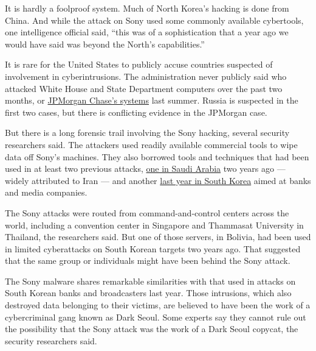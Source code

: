 It is hardly a foolproof system. Much of North Korea's hacking is done
from China. And while the attack on Sony used some commonly available
cybertools, one intelligence official said, ``this was of a
sophistication that a year ago we would have said was beyond the North's
capabilities.''

It is rare for the United States to publicly accuse countries suspected
of involvement in cyberintrusions. The administration never publicly
said who attacked White House and State Department computers over the
past two months, or
\href{http://dealbook.nytimes3xbfgragh.onion/2014/10/02/jpmorgan-discovers-further-cyber-security-issues/?module=Search\&mabReward=relbias\%3Ar\%2C\%7B\%221\%22\%3A\%22RI\%3A8\%22\%7D}{JPMorgan
Chase's systems} last summer. Russia is suspected in the first two
cases, but there is conflicting evidence in the JPMorgan case.

But there is a long forensic trail involving the Sony hacking, several
security researchers said. The attackers used readily available
commercial tools to wipe data off Sony's machines. They also borrowed
tools and techniques that had been used in at least two previous
attacks,
\href{http://www.nytimes3xbfgragh.onion/2012/10/14/world/middleeast/us-suspects-iranians-were-behind-a-wave-of-cyberattacks.html?pagewanted=all\&module=Search\&mabReward=relbias\%3Ar\%2C\%7B\%221\%22\%3A\%22RI\%3A8\%22\%7D}{one
in Saudi Arabia} two years ago --- widely attributed to Iran --- and
another
\href{http://www.nytimes3xbfgragh.onion/2013/03/21/world/asia/south-korea-computer-network-crashes.html?pagewanted=all\&module=Search\&mabReward=relbias\%3Ar\%2C\%7B\%221\%22\%3A\%22RI\%3A8\%22\%7D}{last
year in South Korea} aimed at banks and media companies.

The Sony attacks were routed from command-and-control centers across the
world, including a convention center in Singapore and Thammasat
University in Thailand, the researchers said. But one of those servers,
in Bolivia, had been used in limited cyberattacks on South Korean
targets two years ago. That suggested that the same group or individuals
might have been behind the Sony attack.

The Sony malware shares remarkable similarities with that used in
attacks on South Korean banks and broadcasters last year. Those
intrusions, which also destroyed data belonging to their victims, are
believed to have been the work of a cybercriminal gang known as Dark
Seoul. Some experts say they cannot rule out the possibility that the
Sony attack was the work of a Dark Seoul copycat, the security
researchers said.

